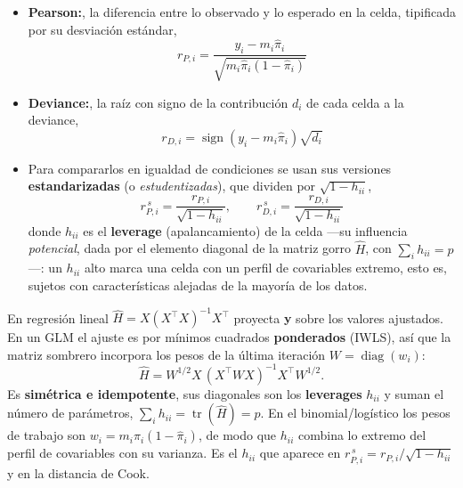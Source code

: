 \documentclass[
  letterpaper,
  DIV=11,
  numbers=noendperiod]{scrartcl}
\begin{document}
\begin{itemize}
\item
  \textbf{Pearson:}, la diferencia entre lo observado y lo esperado en
  la celda, tipificada por su desviación estándar,
  \[r_{P,i}=\dfrac{y_i-m_i\hat\pi_i}{\sqrt{m_i\hat\pi_i(1-\hat\pi_i)}}\]
\item
  \textbf{Deviance:}, la raíz con signo de la contribución \(d_i\) de
  cada celda a la deviance,
  \[r_{D,i}=\operatorname{sign}(y_i-m_i\hat\pi_i)\sqrt{d_i}\]
\item
  Para compararlos en igualdad de condiciones se usan sus versiones
  \textbf{estandarizadas} (o \emph{estudentizadas}), que dividen por
  \(\sqrt{1-h_{ii}}\), \[
  r^{\,s}_{P,i}=\frac{r_{P,i}}{\sqrt{1-h_{ii}}}, \qquad r^{\,s}_{D,i}=\frac{r_{D,i}}{\sqrt{1-h_{ii}}}
  \] donde \(h_{ii}\) es el \textbf{leverage} (apalancamiento) de la
  celda ---su influencia \emph{potencial}, dada por el elemento diagonal
  de la matriz gorro \(\hat H\), con \(\sum_i h_{ii}=p\)---: un
  \(h_{ii}\) alto marca una celda con un perfil de covariables extremo,
  esto es, sujetos con características alejadas de la mayoría de los
  datos.
\end{itemize}

\begin{tcolorbox}[enhanced jigsaw, breakable, colframe=quarto-callout-note-color-frame, left=2mm, arc=.35mm, colbacktitle=quarto-callout-note-color!10!white, toprule=.15mm, colback=white, coltitle=black, rightrule=.15mm, opacitybacktitle=0.6, title=\textcolor{quarto-callout-note-color}{\faInfo}\hspace{0.5em}{La matriz sombrero en un GLM}, titlerule=0mm, toptitle=1mm, bottomtitle=1mm, leftrule=.75mm, bottomrule=.15mm, opacityback=0]

En regresión lineal \(\hat H = X(X^{\top}X)^{-1}X^{\top}\) proyecta
\(\mathbf y\) sobre los valores ajustados. En un GLM el ajuste es por
mínimos cuadrados \textbf{ponderados} (IWLS), así que la matriz sombrero
incorpora los pesos de la última iteración
\(W=\operatorname{diag}(w_i)\): \[
\hat H = W^{1/2}X\,(X^{\top}WX)^{-1}X^{\top}W^{1/2}.
\] Es \textbf{simétrica e idempotente}, sus diagonales son los
\textbf{leverages} \(h_{ii}\) y suman el número de parámetros,
\(\sum_i h_{ii}=\operatorname{tr}(\hat H)=p\). En el binomial/logístico
los pesos de trabajo son \(w_i=m_i\hat\pi_i(1-\hat\pi_i)\), de modo que
\(h_{ii}\) combina lo extremo del perfil de covariables con su varianza.
Es el \(h_{ii}\) que aparece en
\(r^{\,s}_{P,i}=r_{P,i}/\sqrt{1-h_{ii}}\) y en la distancia de Cook.

\end{tcolorbox}
\end{document}
